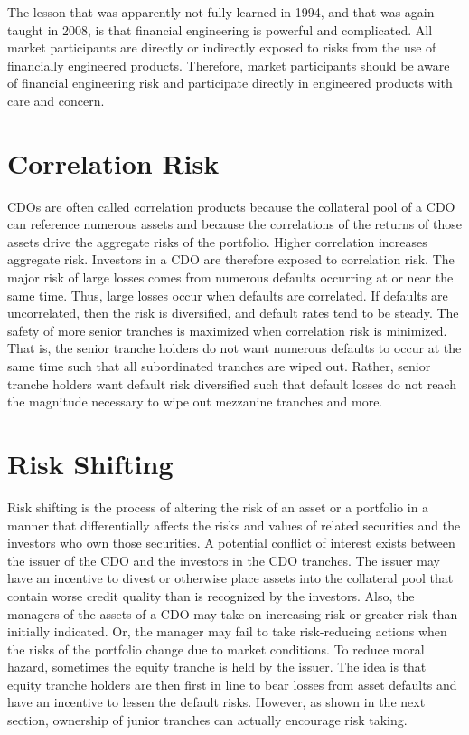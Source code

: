 \documentclass[11pt]{article}
\begin{document}
The lesson that was apparently not fully learned in 1994, and that was again taught in 2008, is that financial engineering is powerful and complicated. All market participants are directly or indirectly exposed to risks from the use of financially engineered products. Therefore, market participants should be aware of financial engineering risk and participate directly in engineered products with care and concern.

\section*{Correlation Risk}
CDOs are often called correlation products because the collateral pool of a CDO can reference numerous assets and because the correlations of the returns of those assets drive the aggregate risks of the portfolio. Higher correlation increases aggregate risk. Investors in a CDO are therefore exposed to correlation risk. The major risk of large losses comes from numerous defaults occurring at or near the same time. Thus, large losses occur when defaults are correlated. If defaults are uncorrelated, then the risk is diversified, and default rates tend to be steady. The safety of more senior tranches is maximized when correlation risk is minimized. That is, the senior tranche holders do not want numerous defaults to occur at the same time such that all subordinated tranches are wiped out. Rather, senior tranche holders want default risk diversified such that default losses do not reach the magnitude necessary to wipe out mezzanine tranches and more.

\section*{Risk Shifting}
Risk shifting is the process of altering the risk of an asset or a portfolio in a manner that differentially affects the risks and values of related securities and the investors who own those securities. A potential conflict of interest exists between the issuer of the CDO and the investors in the CDO tranches. The issuer may have an incentive to divest or otherwise place assets into the collateral pool that contain worse credit quality than is recognized by the investors. Also, the managers of the assets of a CDO may take on increasing risk or greater risk than initially indicated. Or, the manager may fail to take risk-reducing actions when the risks of the portfolio change due to market conditions. To reduce moral hazard, sometimes the equity tranche is held by the issuer. The idea is that equity tranche holders are then first in line to bear losses from asset defaults and have an incentive to lessen the default risks. However, as shown in the next section, ownership of junior tranches can actually encourage risk taking.
\end{document}
